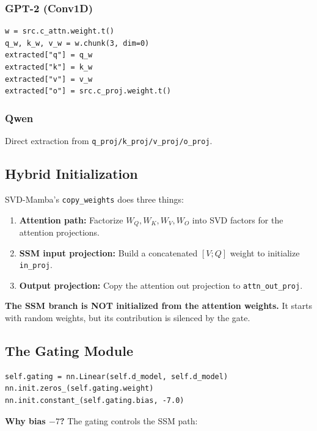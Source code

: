\subsubsection{GPT-2 (Conv1D)}

\begin{lstlisting}
w = src.c_attn.weight.t()
q_w, k_w, v_w = w.chunk(3, dim=0)
extracted["q"] = q_w
extracted["k"] = k_w
extracted["v"] = v_w
extracted["o"] = src.c_proj.weight.t()
\end{lstlisting}

\subsubsection{Qwen}

Direct extraction from \texttt{q\_proj/k\_proj/v\_proj/o\_proj}.

\subsection{Hybrid Initialization}

SVD-Mamba's \texttt{copy\_weights} does three things:

\begin{enumerate}
\item \textbf{Attention path:} Factorize $W_Q, W_K, W_V, W_O$ into SVD factors
  for the attention projections.
\item \textbf{SSM input projection:} Build a concatenated $[V; Q]$ weight to
  initialize \texttt{in\_proj}.
\item \textbf{Output projection:} Copy the attention out projection to \texttt{attn\_out\_proj}.

\end{enumerate}
\textbf{The SSM branch is NOT initialized from the attention weights.} It starts 
with random weights, but its contribution is silenced by the gate.

\subsection{The Gating Module}

\begin{lstlisting}
self.gating = nn.Linear(self.d_model, self.d_model)
nn.init.zeros_(self.gating.weight)
nn.init.constant_(self.gating.bias, -7.0)
\end{lstlisting}

\textbf{Why bias $-7$?} The gating controls the SSM path:


